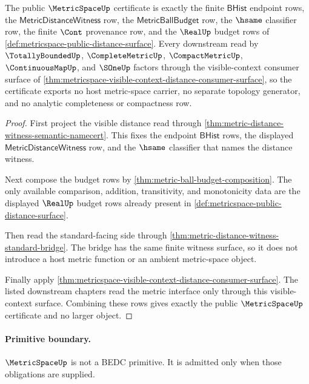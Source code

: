 \begin{theorem}
\label{thm:metricspace-visible-context-public-certificate}
The public $\MetricSpaceUp$ certificate is exactly the finite
$\mathsf{BHist}$ endpoint rows, the $\mathsf{MetricDistanceWitness}$ row, the
$\mathsf{MetricBallBudget}$ row, the $\hsame$ classifier row, the finite
$\Cont$ provenance row, and the $\RealUp$ budget rows of
\autoref{def:metricspace-public-distance-surface}. Every downstream read by
$\TotallyBoundedUp$, $\CompleteMetricUp$, $\CompactMetricUp$,
$\ContinuousMapUp$, and $\SOneUp$ factors through the visible-context consumer
surface of
\autoref{thm:metricspace-visible-context-distance-consumer-surface}, so the
certificate exports no host metric-space carrier, no separate topology
generator, and no analytic completeness or compactness row.
\end{theorem}
\begin{proof}
First project the visible distance read through
\autoref{thm:metric-distance-witness-semantic-namecert}. This fixes the
endpoint $\mathsf{BHist}$ rows, the displayed
$\mathsf{MetricDistanceWitness}$ row, and the $\hsame$ classifier that names
the distance witness.

Next compose the budget rows by
\autoref{thm:metric-ball-budget-composition}. The only available comparison,
addition, transitivity, and monotonicity data are the displayed $\RealUp$
budget rows already present in
\autoref{def:metricspace-public-distance-surface}.

Then read the standard-facing side through
\autoref{thm:metric-distance-witness-standard-bridge}. The bridge has the same
finite witness surface, so it does not introduce a host metric function or an
ambient metric-space object.

Finally apply
\autoref{thm:metricspace-visible-context-distance-consumer-surface}. The
listed downstream chapters read the metric interface only through this
visible-context surface. Combining these rows gives exactly the public
$\MetricSpaceUp$ certificate and no larger object.
\end{proof}

\paragraph{Primitive boundary.}
\(\MetricSpaceUp\) is not a BEDC primitive. It is admitted only when those obligations are supplied.


